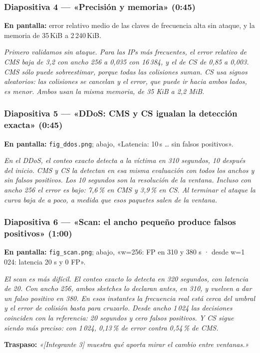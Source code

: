 \documentclass[11pt]{article}
\newcommand{\code}[1]{\texttt{#1}}
\newcommand{\decir}[1]{%
  \par\noindent\colorbox{guion}{\parbox{\dimexpr\linewidth-2\fboxsep}{\small\textit{#1}}}\par\medskip}
\begin{document}
\subsubsection*{Diapositiva 4 — «Precisión y memoria» (0:45)}
\textbf{En pantalla:} error relativo medio de las claves de frecuencia alta sin ataque, y la memoria de 35\,KiB a 2\,240\,KiB.
\decir{Primero validamos sin ataque. Para las IPs más frecuentes, el error relativo de CMS baja de 3,2 con ancho 256 a 0,035 con 16\,384, y el de CS de 0,85 a 0,003. CMS sólo puede sobreestimar, porque todas las colisiones suman. CS usa signos aleatorios: las colisiones se cancelan y el error, que puede ir hacia ambos lados, es menor. Ambos usan la misma memoria, de 35 KiB a 2,2 MiB.}

\subsubsection*{Diapositiva 5 — «DDoS: CMS y CS igualan la detección exacta» (0:45)}
\textbf{En pantalla:} \code{fig\_ddos.png}; abajo, «Latencia: 10\,s … sin falsos positivos».
\decir{En el DDoS, el conteo exacto detecta a la víctima en 310 segundos, 10 después del inicio. CMS y CS la detectan en esa misma evaluación con todos los anchos y sin falsos positivos. Los 10 segundos son la resolución de la ventana. Incluso con ancho 256 el error es bajo: 7,6\,\% en CMS y 3,9\,\% en CS. Al terminar el ataque la curva baja de a poco, a medida que esos paquetes salen de la ventana.}

\subsubsection*{Diapositiva 6 — «Scan: el ancho pequeño produce falsos positivos» (1:00)}
\textbf{En pantalla:} \code{fig\_scan.png}; abajo, «w=256: FP en 310 y 380 s · desde w=1\,024: latencia 20 s y 0 FP».
\decir{El scan es más difícil. El conteo exacto lo detecta en 320 segundos, con latencia de 20. Con ancho 256, ambos sketches lo declaran antes, en 310, y vuelven a dar un falso positivo en 380. En esos instantes la frecuencia real está cerca del umbral y el error de colisión basta para cruzarlo. Desde ancho 1\,024 las decisiones coinciden con la referencia: 20 segundos y cero falsos positivos. Y CS sigue siendo más preciso: con 1\,024, 0,13\,\% de error contra 0,54\,\% de CMS.}

\textbf{Traspaso:} \textit{«[Integrante 3] muestra qué aporta mirar el cambio entre ventanas.»}

\end{document}
